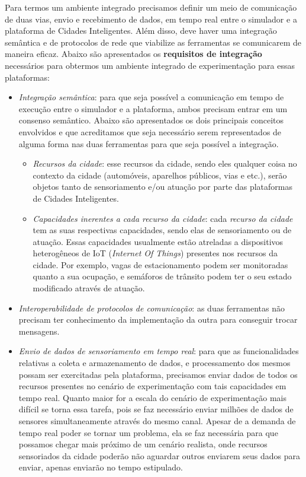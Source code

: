 Para termos um ambiente integrado precisamos definir um meio de comunicação de duas vias, envio e recebimento de dados, em tempo real entre o simulador e a plataforma de Cidades Inteligentes.
Além disso, deve haver uma integração semântica e de protocolos de rede que viabilize as ferramentas se comunicarem de maneira eficaz.
Abaixo são apresentados os \textbf{requisitos de integração} necessários para obtermos um ambiente integrado de experimentação para essas plataformas:

\begin{itemize}
    \item \textit{Integração semântica}: para que seja possível a comunicação em tempo de execução entre o simulador e a plataforma, ambos precisam entrar em um consenso semântico.
        Abaixo são apresentados os dois principais conceitos envolvidos e que acreditamos que seja necessário serem representados de alguma forma nas duas ferramentas para que seja
        possível a integração.

        \begin{itemize}
            \item \textit{Recursos da cidade}: esse recursos da cidade, sendo eles qualquer coisa no contexto da cidade (automóveis, aparelhos públicos, vias e etc.), serão objetos tanto de
                sensoriamento e/ou atuação por parte das plataformas de Cidades Inteligentes.

            \item \textit{Capacidades inerentes a cada recurso da cidade}: cada \textit{recurso da cidade} tem as suas respectivas capacidades, sendo elas de sensoriamento ou de atuação.
                Essas capacidades usualmente estão atreladas a dispositivos heterogêneos de IoT (\textit{Internet Of Things}) presentes nos recursos da cidade.
                Por exemplo, vagas de estacionamento podem ser monitoradas quanto a sua ocupação, e semáforos de trânsito podem ter o seu estado modificado através de atuação.
        \end{itemize}

    \item \textit{Interoperabilidade de protocolos de comunicação}: as duas ferramentas não precisam ter conhecimento da implementação da outra para conseguir trocar mensagens.

    \item \textit{Envio de dados de sensoriamento em tempo real}: para que as funcionalidades relativas a coleta e armazenamento de dados, e processamento dos mesmos possam ser
        exercitadas pela plataforma, precisamos enviar dados de todos os recursos presentes no cenário de experimentação com tais capacidades em tempo real.
        Quanto maior for a escala do cenário de experimentação mais difícil se torna essa tarefa, pois se faz necessário enviar milhões de dados de sensores simultaneamente através
        do mesmo canal.
        Apesar de a demanda de tempo real poder se tornar um problema, ela se faz necessária para que possamos chegar mais próximo de um cenário realista, onde recursos sensoriados
        da cidade poderão não aguardar outros enviarem seus dados para enviar, apenas enviarão no tempo estipulado.


\end{itemize}
